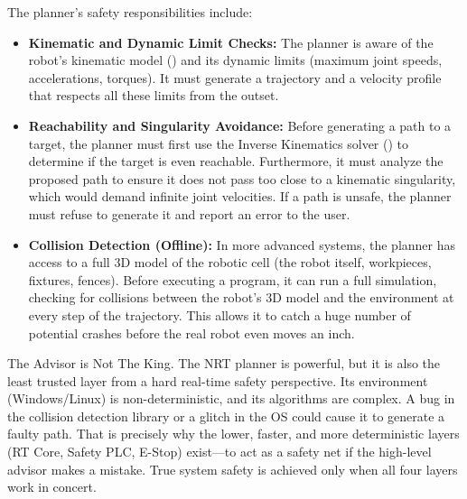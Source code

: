 The planner's safety responsibilities include:
\begin{itemize}
    \item \textbf{Kinematic and Dynamic Limit Checks:} The planner is aware of the robot's kinematic model () and its dynamic limits (maximum joint speeds, accelerations, torques). It must generate a trajectory and a velocity profile that respects all these limits from the outset.
    
    \item \textbf{Reachability and Singularity Avoidance:} Before generating a path to a target, the planner must first use the Inverse Kinematics solver () to determine if the target is even reachable. Furthermore, it must analyze the proposed path to ensure it does not pass too close to a kinematic singularity, which would demand infinite joint velocities. If a path is unsafe, the planner must refuse to generate it and report an error to the user.
    
    \item \textbf{Collision Detection (Offline):} In more advanced systems, the planner has access to a full 3D model of the robotic cell (the robot itself, workpieces, fixtures, fences). Before executing a program, it can run a full simulation, checking for collisions between the robot's 3D model and the environment at every step of the trajectory. This allows it to catch a huge number of potential crashes before the real robot even moves an inch.
\end{itemize}

\begin{dangerbox}{The Advisor is Not The King.}
    The NRT planner is powerful, but it is also the least trusted layer from a hard real-time safety perspective. Its environment (Windows/Linux) is non-deterministic, and its algorithms are complex. A bug in the collision detection library or a glitch in the OS could cause it to generate a faulty path. That is precisely why the lower, faster, and more deterministic layers (RT Core, Safety PLC, E-Stop) exist—to act as a safety net if the high-level advisor makes a mistake. True system safety is achieved only when all four layers work in concert.
\end{dangerbox}



